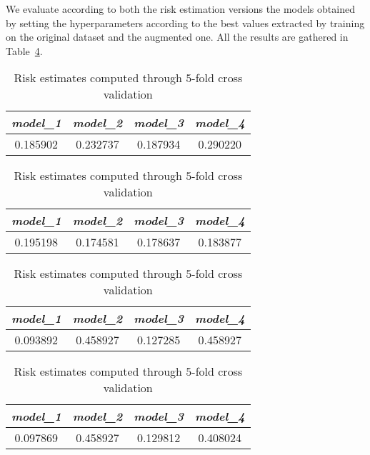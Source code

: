We evaluate according to both the risk estimation versions the models obtained by setting the hyperparameters according to the best values extracted by training on the original dataset and the augmented one. All the results are gathered in Table~\ref{tab:riskEstimates}.
\begin{table}
    \begin{subtable}{\textwidth}
        \centering
        \begin{tabular}{cccc}        
            \textit{model\_1} &\textit{model\_2} & \textit{model\_3} & \textit{model\_4} \\
            \midrule
            0.185902 & 0.232737 & 0.187934 & 0.290220
        \end{tabular}
        \label{tab:riskEst_originalDataset_withoutAug}
    \end{subtable}
    \bigbreak
    \begin{subtable}{\textwidth}
        \centering
        \begin{tabular}{cccc}        
            \textit{model\_1} &\textit{model\_2} & \textit{model\_3} & \textit{model\_4} \\
            \midrule            
            0.195198 & 0.174581 & 0.178637 & 0.183877
        \end{tabular}
        \label{tab:riskEst_originalDataset_withAug}
    \end{subtable}
    \bigbreak
    \bigbreak
    \begin{subtable}{\textwidth}
        \centering
        \begin{tabular}{cccc}        
            \textit{model\_1} &\textit{model\_2} & \textit{model\_3} & \textit{model\_4} \\
            \midrule            
            0.093892 & 0.458927 & 0.127285 & 0.458927
        \end{tabular}
        \label{tab:riskEst_datasetWithoutVal_withoutAug}
    \end{subtable}\bigbreak
    \begin{subtable}{\textwidth}
        \centering
        \begin{tabular}{cccc}        
            \textit{model\_1} &\textit{model\_2} & \textit{model\_3} & \textit{model\_4} \\
            \midrule            
            0.097869 & 0.458927 & 0.129812 & 0.408024
        \end{tabular}
        \label{tab:riskEst_datasetWithoutVal_withAug}
    \end{subtable}

    \caption{Risk estimates computed through $5$-fold cross validation}
    \label{tab:riskEstimates}
\end{table}

